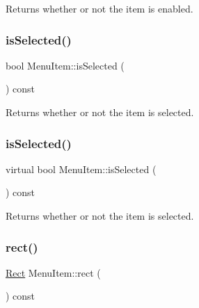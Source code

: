 Returns whether or not the item is enabled. \mbox{\label{classMenuItem_ac7e4669ecbc27decbb181f1ad2db7817}} 
\subsubsection{\texorpdfstring{is\+Selected()}{isSelected()}\hspace{0.1cm}{\footnotesize\ttfamily [1/2]}}
{\footnotesize\ttfamily bool Menu\+Item\+::is\+Selected (\begin{DoxyParamCaption}{ }\end{DoxyParamCaption}) const\hspace{0.3cm}{\ttfamily [virtual]}}

Returns whether or not the item is selected. \mbox{\label{classMenuItem_a1c6d2c32aa42988ecb019a5009a8c005}} 
\subsubsection{\texorpdfstring{is\+Selected()}{isSelected()}\hspace{0.1cm}{\footnotesize\ttfamily [2/2]}}
{\footnotesize\ttfamily virtual bool Menu\+Item\+::is\+Selected (\begin{DoxyParamCaption}{ }\end{DoxyParamCaption}) const\hspace{0.3cm}{\ttfamily [virtual]}}

Returns whether or not the item is selected. \mbox{\label{classMenuItem_a3d6b05193856cc8d5e5e2a2d98736e4c}} 
\subsubsection{\texorpdfstring{rect()}{rect()}\hspace{0.1cm}{\footnotesize\ttfamily [1/2]}}
{\footnotesize\ttfamily \hyperlink{classRect}{Rect} Menu\+Item\+::rect (\begin{DoxyParamCaption}{ }\end{DoxyParamCaption}) const}

